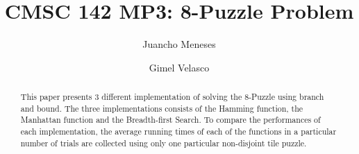 \documentclass[sigconf]{acmart}
\begin{document}
\title{CMSC 142 MP3: 8-Puzzle Problem}



\author{Juancho Meneses}

\author{Gimel Velasco}



\begin{abstract}
This paper presents 3 different implementation of solving the 8-Puzzle using branch and bound. The three implementations consists of the Hamming function, the Manhattan function and the Breadth-first Search. To compare the performances of each implementation, the average running times of each of the functions in a particular number of trials are collected using only one particular non-disjoint tile puzzle.

\end{abstract}



\maketitle




\nocite{back1}
 
\end{document}
